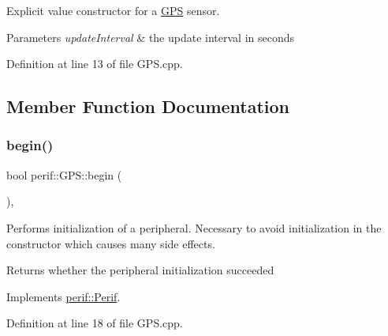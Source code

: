 Explicit value constructor for a \mbox{\hyperlink{classperif_1_1GPS}{G\+PS}} sensor.


\begin{DoxyParams}{Parameters}
{\em update\+Interval} & the update interval in seconds \\
\hline
\end{DoxyParams}


Definition at line 13 of file G\+P\+S.\+cpp.


\begin{DoxyCode}{0}

\end{DoxyCode}


\subsection{Member Function Documentation}
\mbox{\label{classperif_1_1GPS_add9ec977f37224c9f2e87c5a932a55bd}} 
\subsubsection{\texorpdfstring{begin()}{begin()}}
{\footnotesize\ttfamily bool perif\+::\+G\+P\+S\+::begin (\begin{DoxyParamCaption}{ }\end{DoxyParamCaption})\hspace{0.3cm}{\ttfamily [override]}, {\ttfamily [virtual]}}

Performs initialization of a peripheral. Necessary to avoid initialization in the constructor which causes many side effects.

\begin{DoxyReturn}{Returns}
whether the peripheral initialization succeeded 
\end{DoxyReturn}


Implements \mbox{\hyperlink{classperif_1_1Perif_ae7f1d1a4e9cd2343d51abc4ee21000cf}{perif\+::\+Perif}}.



Definition at line 18 of file G\+P\+S.\+cpp.


